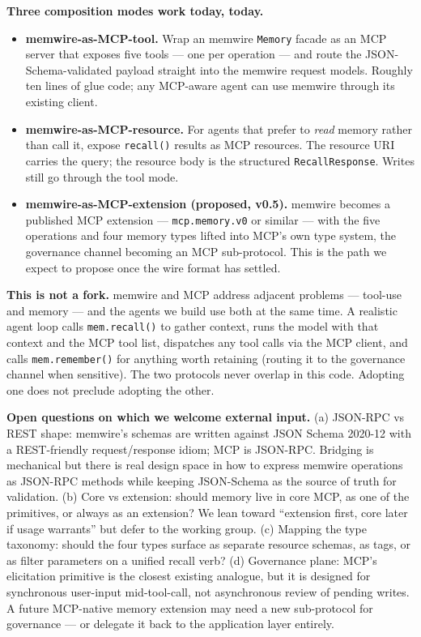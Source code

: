 \documentclass[11pt,letterpaper,twocolumn]{article}
\begin{document}
\textbf{Three composition modes work today, today.}

\begin{itemize}[leftmargin=*]
  \item \textbf{memwire-as-MCP-tool.} Wrap an memwire \texttt{Memory} facade as an MCP server that exposes five tools --- one per operation --- and route the JSON-Schema-validated payload straight into the memwire request models. Roughly ten lines of glue code; any MCP-aware agent can use memwire through its existing client.
  \item \textbf{memwire-as-MCP-resource.} For agents that prefer to \emph{read} memory rather than call it, expose \texttt{recall()} results as MCP resources. The resource URI carries the query; the resource body is the structured \texttt{RecallResponse}. Writes still go through the tool mode.
  \item \textbf{memwire-as-MCP-extension (proposed, v0.5).} memwire becomes a published MCP extension --- \texttt{mcp.memory.v0} or similar --- with the five operations and four memory types lifted into MCP's own type system, the governance channel becoming an MCP sub-protocol. This is the path we expect to propose once the wire format has settled.
\end{itemize}

\textbf{This is not a fork.} memwire and MCP address adjacent problems --- tool-use and memory --- and the agents we build use both at the same time. A realistic agent loop calls \texttt{mem.recall()} to gather context, runs the model with that context and the MCP tool list, dispatches any tool calls via the MCP client, and calls \texttt{mem.remember()} for anything worth retaining (routing it to the governance channel when sensitive). The two protocols never overlap in this code. Adopting one does not preclude adopting the other.

\textbf{Open questions on which we welcome external input.} (a) JSON-RPC vs REST shape: memwire's schemas are written against JSON Schema 2020-12 with a REST-friendly request/response idiom; MCP is JSON-RPC. Bridging is mechanical but there is real design space in how to express memwire operations as JSON-RPC methods while keeping JSON-Schema as the source of truth for validation. (b) Core vs extension: should memory live in core MCP, as one of the primitives, or always as an extension? We lean toward ``extension first, core later if usage warrants'' but defer to the working group. (c) Mapping the type taxonomy: should the four types surface as separate resource schemas, as tags, or as filter parameters on a unified recall verb? (d) Governance plane: MCP's elicitation primitive is the closest existing analogue, but it is designed for synchronous user-input mid-tool-call, not asynchronous review of pending writes. A future MCP-native memory extension may need a new sub-protocol for governance --- or delegate it back to the application layer entirely.
\end{document}
